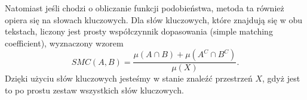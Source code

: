 \documentclass[a4paper]{classrep}
\begin{document}
Natomiast jeśli chodzi o obliczanie funkcji podobieństwa, metoda ta również opiera się na słowach kluczowych. Dla słów kluczowych, które znajdują się w obu tekstach, liczony jest prosty współczynnik dopasowania (simple matching coefficient), wyznaczony
wzorem
\begin{equation}
SMC(A,B) = \frac{\mu(A \cap B)+\mu(A^C \cap B^C)}{\mu(X)}.
\end{equation}
Dzięki użyciu słów kluczowych jesteśmy w stanie znaleźć przestrzeń \(X\), gdyż jest to po prostu zestaw wszystkich słów kluczowych.
%
%
\end{document}
